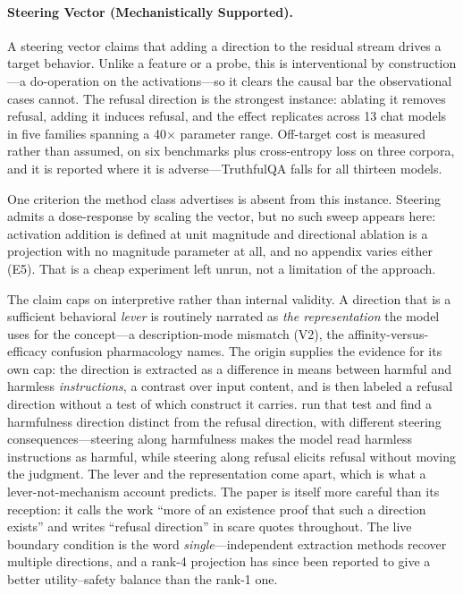 \documentclass{article}
\begin{document}
\paragraph{Steering Vector (Mechanistically Supported).} A steering vector claims that adding a direction to the residual stream drives a target behavior. Unlike a feature or a probe, this is interventional by construction---a $\mathrm{do}$-operation on the activations---so it clears the causal bar the observational cases cannot. The refusal direction \citep{arditi2024refusal} is the strongest instance: ablating it removes refusal, adding it induces refusal, and the effect replicates across 13 chat models in five families spanning a 40$\times$ parameter range. Off-target cost is measured rather than assumed, on six benchmarks plus cross-entropy loss on three corpora, and it is reported where it is adverse---TruthfulQA falls for all thirteen models.

One criterion the method class advertises is absent from this instance. Steering admits a dose-response by scaling the vector, but no such sweep appears here: activation addition is defined at unit magnitude and directional ablation is a projection with no magnitude parameter at all, and no appendix varies either (E5). That is a cheap experiment left unrun, not a limitation of the approach.

The claim caps on interpretive rather than internal validity. A direction that is a sufficient behavioral \emph{lever} is routinely narrated as \emph{the representation} the model uses for the concept---a description-mode mismatch (V2), the affinity-versus-efficacy confusion pharmacology names. The origin supplies the evidence for its own cap: the direction is extracted as a difference in means between harmful and harmless \emph{instructions}, a contrast over input content, and is then labeled a refusal direction without a test of which construct it carries. \citet{zhao2025harmfulness} run that test and find a harmfulness direction distinct from the refusal direction, with different steering consequences---steering along harmfulness makes the model read harmless instructions as harmful, while steering along refusal elicits refusal without moving the judgment. The lever and the representation come apart, which is what a lever-not-mechanism account predicts. The paper is itself more careful than its reception: it calls the work ``more of an existence proof that such a direction exists'' and writes ``refusal direction'' in scare quotes throughout. The live boundary condition is the word \emph{single}---independent extraction methods recover multiple directions, and a rank-4 projection has since been reported to give a better utility--safety balance than the rank-1 one.
\end{document}

